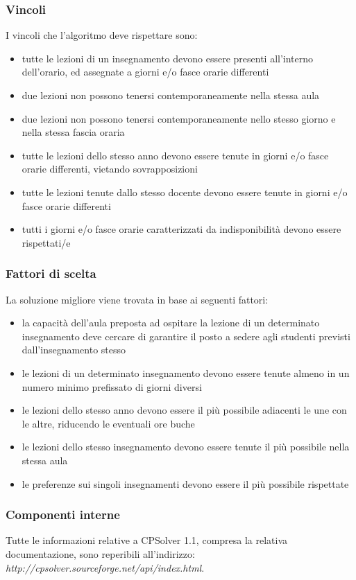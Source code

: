 \documentclass[11pt,a4paper]{article}
\begin{document}
\subsubsection*{Vincoli}
I vincoli che l'algoritmo deve rispettare sono:
\begin{itemize}
 \item tutte le lezioni di un insegnamento devono essere presenti all'interno dell'orario, ed assegnate a giorni e/o fasce orarie differenti
 \item due lezioni non possono tenersi contemporaneamente nella stessa aula
 \item due lezioni non possono tenersi contemporaneamente nello stesso giorno e nella stessa fascia oraria
 \item tutte le lezioni dello stesso anno devono essere tenute in giorni e/o fasce orarie differenti, vietando sovrapposizioni
 \item tutte le lezioni tenute dallo stesso docente devono essere tenute in giorni e/o fasce orarie differenti
 \item tutti i giorni e/o fasce orarie caratterizzati da indisponibilità devono essere rispettati/e
\end{itemize}
\subsubsection*{Fattori di scelta}
La soluzione migliore viene trovata in base ai seguenti fattori:
\begin{itemize}
 \item la capacità dell'aula preposta ad ospitare la lezione di un determinato insegnamento deve cercare di garantire il posto a sedere agli studenti previsti dall'insegnamento stesso
 \item le lezioni di un determinato insegnamento devono essere tenute almeno in un numero minimo prefissato di giorni diversi
 \item le lezioni dello stesso anno devono essere il più possibile adiacenti le une con le altre, riducendo le eventuali ore buche
 \item le lezioni dello stesso insegnamento devono essere tenute il più possibile nella stessa aula
 \item le preferenze sui singoli insegnamenti devono essere il più possibile rispettate
\end{itemize}
\subsubsection*{Componenti interne}
Tutte le informazioni relative a CPSolver 1.1, compresa la relativa documentazione, sono reperibili all'indirizzo: \textit{http://cpsolver.sourceforge.net/api/index.html}.
\end{document}
